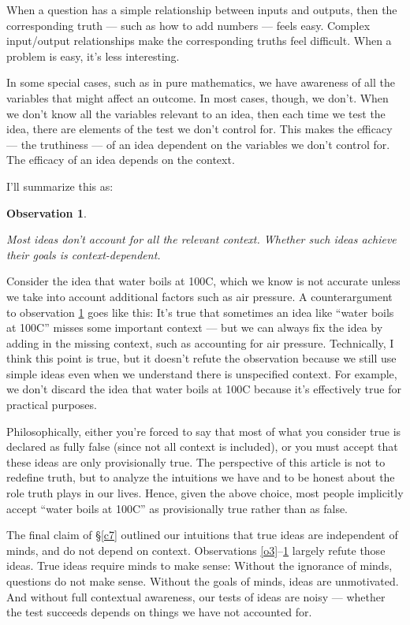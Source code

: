 \documentclass[11pt, oneside]{article}
\newtheorem{obs}{Observation}
\theoremstyle{argtstyle}
\begin{document}
When a question has a simple relationship between inputs and outputs, then the
corresponding truth --- such as how to add numbers --- feels easy. Complex
input/output relationships make the corresponding truths feel difficult.
When a problem is easy, it's less interesting.

In some special cases, such as in pure mathematics,
we have awareness of all the variables that might affect an outcome.
In most cases, though, we don't.
When we don't know all the variables relevant to an idea, then each time we
test the idea, there are elements of the test we don't control for.
This makes the efficacy --- the truthiness --- of an idea dependent on the
variables we don't control for. The efficacy of an idea
depends on the context.

I'll summarize this as:
\newcommand{\obssix}{
    Most ideas don't account for all the relevant context.
    Whether such ideas achieve their goals is context-dependent.
}
\begin{obs}\label{o6}
    \obssix
\end{obs}

Consider the idea that water boils at
100\degree C, which we know is not accurate unless we take into account
additional factors such as air pressure.
A counterargument to observation \ref{o6} goes like this:
It's true that sometimes an idea like ``water boils at 100\degree C'' misses
some important context --- but we can always fix the idea by adding in the
missing context, such as accounting for air pressure.
Technically, I think this point is true, but
it doesn't refute the observation because we still use simple
ideas even when we understand there is unspecified context.
For example, we don't discard the idea that water boils at 100\degree C because
it's effectively true for practical purposes.

Philosophically, either you're
forced to say that
most of what you consider true is declared as fully false (since not
all context is included), or you must accept that these ideas are only
provisionally true.
The perspective of this article is not to redefine truth, but to analyze the
intuitions we have and to be honest about the role truth plays in our lives.
Hence, given the above choice, most people
implicitly accept
``water boils at 100\degree C'' as
provisionally true rather than as false.

The final claim of \S\ref{c7}
outlined our intuitions that true ideas are independent
of minds, and do not depend on context.
Observations \ref{o3}--\ref{o6} largely refute those ideas.
True ideas require minds to make sense:
Without the ignorance of minds, questions do not make sense.
Without the goals of minds, ideas are unmotivated.
And without full contextual awareness, our tests of ideas are noisy ---
whether the test succeeds depends on things we have not accounted
for.
\end{document}

